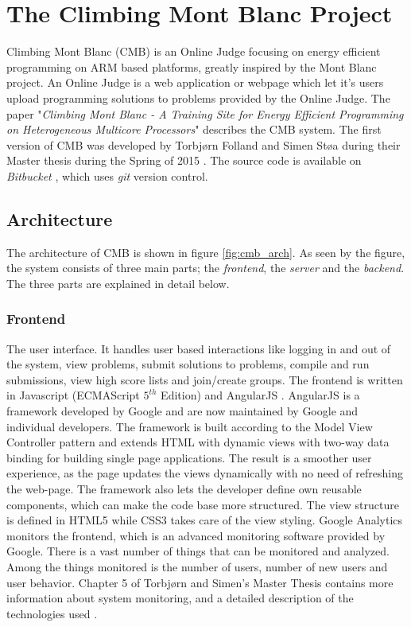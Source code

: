 \section{The Climbing Mont Blanc Project}
Climbing Mont Blanc (CMB) is an Online Judge focusing on energy efficient programming on ARM based platforms, greatly inspired by the Mont Blanc project. An Online Judge is a web application or webpage which let it's users upload programming solutions to problems provided by the Online Judge. The paper "\textit{Climbing Mont Blanc - A Training Site for Energy Efficient Programming on Heterogeneous Multicore Processors}" \cite{a:CMB} describes the CMB system. The first version of CMB was developed by Torbjørn Folland and Simen Støa during their Master thesis during the Spring of 2015 \cite{mt:T&S}. The source code is available on \textit{Bitbucket} \cite{m:bitbucket}, which uses \textit{git} \cite{m:git} version control.

\subsection{Architecture}
The architecture of CMB is shown in figure \ref{fig:cmb_arch}. As seen by the figure, the system consists of three main parts; the \textit{frontend}, the \textit{server} and the \textit{backend}. The three parts are explained in detail below.


\subsubsection{Frontend} The user interface. It handles user based interactions like logging in and out of the system, view problems, submit solutions to problems, compile and run submissions, view high score lists and join/create groups. The frontend is written in Javascript (ECMAScript $5^{th}$ Edition) and AngularJS \cite{m:angular}. AngularJS is a framework developed by Google and are now maintained by Google and individual developers. The framework is built according to the Model View Controller pattern and extends HTML with dynamic views with two-way data binding for building single page applications. The result is a smoother user experience, as the page updates the views dynamically with no need of refreshing the web-page. The framework also lets the developer define own reusable components, which can make the code base more structured. The view structure is defined in HTML5 while CSS3 takes care of the view styling. Google Analytics monitors the frontend, which is an advanced monitoring software provided by Google. There is a vast number of things that can be monitored and analyzed. Among the things monitored is the number of users, number of new users and user behavior. Chapter 5 of Torbjørn and Simen's Master Thesis contains more information about system monitoring, and a detailed description of the technologies used \cite{mt:T&S}. \\

